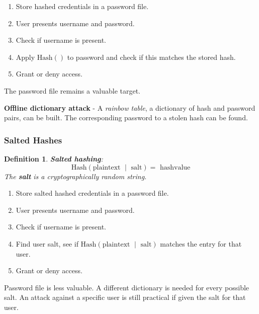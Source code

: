 \documentclass[11pt]{article}
\newtheorem{defn}{Definition}
\begin{document}
\begin{enumerate}
  \item Store hashed credentials in a password file.
  \item User presents username and password.
  \item Check if username is present.
  \item Apply $\text{Hash}()$ to password and check if this matches the stored hash.
  \item Grant or deny access.
\end{enumerate}

The password file remains a valuable target.

\textbf{Offline dictionary attack} - A \textit{rainbow table}, a dictionary of hash and password pairs, can be built.
The corresponding password to a stolen hash can be found.

\subsubsection{Salted Hashes}
\begin{defn}
  \textbf{Salted hashing}:
  \[
    \text{Hash}(\text{plaintext } \mid \text{ salt}) = \text{ hashvalue}
  \]
  The \textbf{salt} is a cryptographically random string.
\end{defn}

\begin{enumerate}
  \item Store salted hashed credentials in a password file.
  \item User presents username and password.
  \item Check if username is present.
  \item Find user salt, see if $\text{Hash}(\text{plaintext } \mid \text{ salt})$ matches the entry for that user.
  \item Grant or deny access.
\end{enumerate}

Password file is less valuable.
A different dictionary is needed for every possible salt.
An attack against a specific user is still practical if given the salt for that user.
\end{document}
